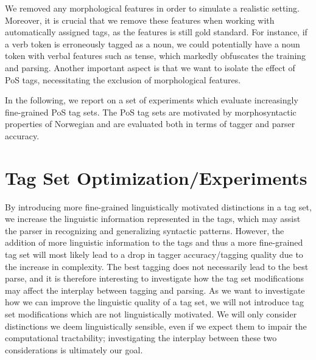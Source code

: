 \documentclass[11pt,a4paper]{article}
\begin{document}
We removed any morphological features in order to simulate a realistic setting.
Moreover, it is crucial that we remove these features when working with
automatically assigned tags, as the features is still gold standard.  For
instance, if a verb token is erroneously tagged as a noun, we could potentially
have a noun token with verbal features such as tense, which markedly obfuscates
the training and parsing. Another important aspect is that we want to isolate
the effect of PoS tags, necessitating the exclusion of morphological features.

In the following, we report on a set of experiments which evaluate
increasingly fine-grained PoS tag sets. The PoS tag sets are motivated
by morphosyntactic properties of Norwegian and are evaluated both in
terms of tagger and parser accuracy.

\section{Tag Set Optimization/Experiments}
\label{sec:optimization}
By introducing more fine-grained linguistically motivated distinctions in a tag
set, we increase the linguistic information represented in the tags, which may
assist the parser in recognizing and generalizing syntactic patterns. However,
the addition of more linguistic information to the tags and thus a more
fine-grained tag set will most likely lead to a drop in tagger accuracy/tagging
quality due to the increase in complexity. The best tagging does not
necessarily lead to the best parse, and it is therefore interesting to
investigate how the tag set modifications may affect the interplay between
tagging and parsing. As we want to investigate how we can improve the
linguistic quality of a tag set, we will not introduce tag set modifications
which are not linguistically motivated. We will only consider distinctions we
deem linguistically sensible, even if we expect them to impair the
computational tractability; investigating the interplay between these two
considerations is ultimately our goal.
\end{document}
